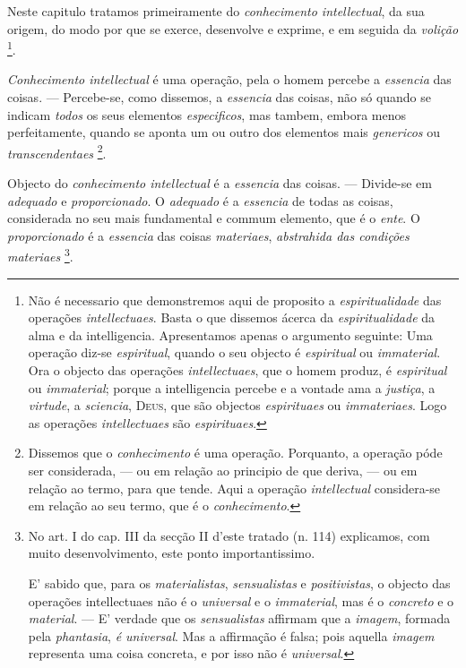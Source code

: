 Neste capitulo tratamos primeiramente do \emph{conhecimento intellectual}, da sua origem, do modo por que se exerce, desenvolve e exprime, e em seguida da \emph{volição} \footnote{Não é necessario que demonstremos aqui de proposito a \emph{espiritualidade} das operações \emph{intellectuaes}. Basta o que dissemos ácerca da \emph{espiritualidade} da alma e da intelligencia. Apresentamos apenas o argumento seguinte: Uma operação diz-se \emph{espiritual}, quando o seu objecto é \emph{espiritual} ou \emph{immaterial}. Ora o objecto das operações \emph{intellectuaes}, que o homem produz, é \emph{espiritual} ou \emph{immaterial}; porque a intelligencia percebe e a vontade ama a \emph{justiça}, a \emph{virtude}, a \emph{sciencia}, \textsc{Deus}, que são objectos \emph{espirituaes} ou \emph{immateriaes}. Logo as operações \emph{intellectuaes} são \emph{espirituaes}.}.


\emph{Conhecimento intellectual} é uma operação, pela o homem percebe a \emph{essencia} das coisas. --- Percebe-se, como dissemos, a \emph{essencia} das coisas, não só quando se indicam \emph{todos} os seus elementos \emph{especificos}, mas tambem, embora menos perfeitamente, quando se aponta um ou outro dos elementos mais \emph{genericos} ou \emph{transcendentaes} \footnote{Dissemos que o \emph{conhecimento} é uma operação. Porquanto, a operação póde ser considerada, --- ou em relação ao principio de que deriva, --- ou em relação ao termo, para que tende. Aqui a operação \emph{intellectual} considera-se em relação ao seu termo, que é o \emph{conhecimento}.}.


Objecto do \emph{conhecimento intellectual} é a \emph{essencia} das coisas. --- Divide-se em   \emph{adequado} e \emph{proporcionado}. O \emph{adequado} é a \emph{essencia} de todas as coisas, considerada no seu mais fundamental e commum elemento, que é o \emph{ente}. O \emph{proporcionado} é a \emph{essencia} das coisas \emph{materiaes}, \emph{abstrahida das condições materiaes} \footnote{No art. I do cap. III da secção II d'este tratado (n. 114) explicamos, com muito desenvolvimento, este ponto importantissimo.\par E' sabido que, para os \emph{materialistas}, \emph{sensualistas} e \emph{positivistas}, o objecto das operações intellectuaes não é o \emph{universal} e o \emph{immaterial}, mas é o \emph{concreto} e o \emph{material}. --- E' verdade que os \emph{sensualistas} affirmam que a \emph{imagem}, formada pela \emph{phantasia}, \emph{é universal}. Mas a affirmação é falsa; pois aquella \emph{imagem} representa uma coisa concreta, e por isso não é \emph{universal}.}.

